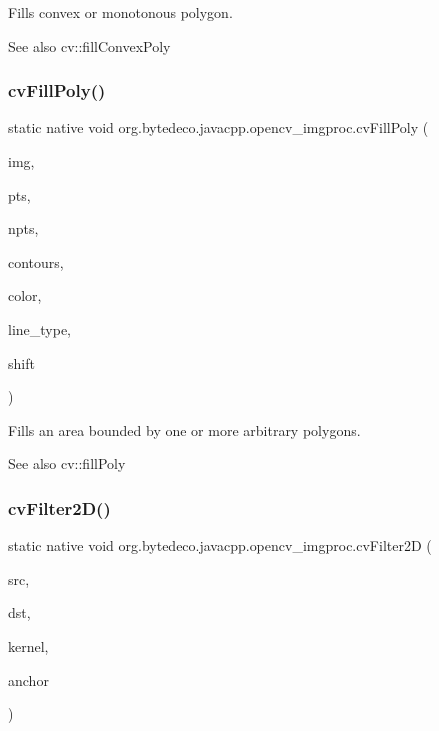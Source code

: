 Fills convex or monotonous polygon. 

\begin{DoxySeeAlso}{See also}
cv\+::fill\+Convex\+Poly 
\end{DoxySeeAlso}
\mbox{\label{group__imgproc__c_gafaa4b2cde022d741d6efd5a6ae9a5ba9}} 
\subsubsection{\texorpdfstring{cv\+Fill\+Poly()}{cvFillPoly()}}
{\footnotesize\ttfamily static native void org.\+bytedeco.\+javacpp.\+opencv\+\_\+imgproc.\+cv\+Fill\+Poly (\begin{DoxyParamCaption}\item[{Cv\+Arr}]{img,  }\item[{@Cast(\char`\"{}Cv\+fr.antproject.utils.Point$\ast$$\ast$\char`\"{}) Pointer\+Pointer}]{pts,  }\item[{@Const Int\+Pointer}]{npts,  }\item[{int}]{contours,  }\item[{@By\+Val Cv\+Scalar}]{color,  }\item[{int}]{line\+\_\+type,  }\item[{int}]{shift }\end{DoxyParamCaption})\hspace{0.3cm}{\ttfamily [static]}}



Fills an area bounded by one or more arbitrary polygons. 

\begin{DoxySeeAlso}{See also}
cv\+::fill\+Poly 
\end{DoxySeeAlso}
\mbox{\label{group__imgproc__c_gaeb0ce4259621b5151099fcc7d4c25522}} 
\subsubsection{\texorpdfstring{cv\+Filter2\+D()}{cvFilter2D()}}
{\footnotesize\ttfamily static native void org.\+bytedeco.\+javacpp.\+opencv\+\_\+imgproc.\+cv\+Filter2D (\begin{DoxyParamCaption}\item[{@Const Cv\+Arr}]{src,  }\item[{Cv\+Arr}]{dst,  }\item[{@Const Cv\+Mat}]{kernel,  }\item[{@By\+Val(null\+Value=\char`\"{}Cv\+fr.antproject.utils.Point(cv\+fr.antproject.utils.Point(-\/1,-\/1))\char`\"{}) Cv\+fr.antproject.utils.Point}]{anchor }\end{DoxyParamCaption})\hspace{0.3cm}{\ttfamily [static]}}



